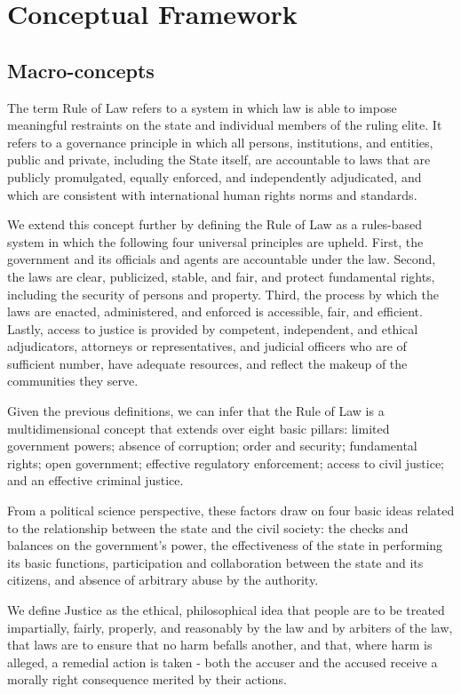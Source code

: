 \documentclass[
]{agujournal2019}
\begin{document}
\section{Conceptual Framework}\label{conceptual-framework}

\subsection{Macro-concepts}\label{macro-concepts}

The term Rule of Law refers to a system in which law is able to impose
meaningful restraints on the state and individual members of the ruling
elite. It refers to a governance principle in which all persons,
institutions, and entities, public and private, including the State
itself, are accountable to laws that are publicly promulgated, equally
enforced, and independently adjudicated, and which are consistent with
international human rights norms and standards.

We extend this concept further by defining the Rule of Law as a
rules-based system in which the following four universal principles are
upheld. First, the government and its officials and agents are
accountable under the law. Second, the laws are clear, publicized,
stable, and fair, and protect fundamental rights, including the security
of persons and property. Third, the process by which the laws are
enacted, administered, and enforced is accessible, fair, and efficient.
Lastly, access to justice is provided by competent, independent, and
ethical adjudicators, attorneys or representatives, and judicial
officers who are of sufficient number, have adequate resources, and
reflect the makeup of the communities they serve.

Given the previous definitions, we can infer that the Rule of Law is a
multidimensional concept that extends over eight basic pillars: limited
government powers; absence of corruption; order and security;
fundamental rights; open government; effective regulatory enforcement;
access to civil justice; and an effective criminal justice.

From a political science perspective, these factors draw on four basic
ideas related to the relationship between the state and the civil
society: the checks and balances on the government's power, the
effectiveness of the state in performing its basic functions,
participation and collaboration between the state and its citizens, and
absence of arbitrary abuse by the authority.

We define Justice as the ethical, philosophical idea that people are to
be treated impartially, fairly, properly, and reasonably by the law and
by arbiters of the law, that laws are to ensure that no harm befalls
another, and that, where harm is alleged, a remedial action is taken -
both the accuser and the accused receive a morally right consequence
merited by their actions.
\end{document}
